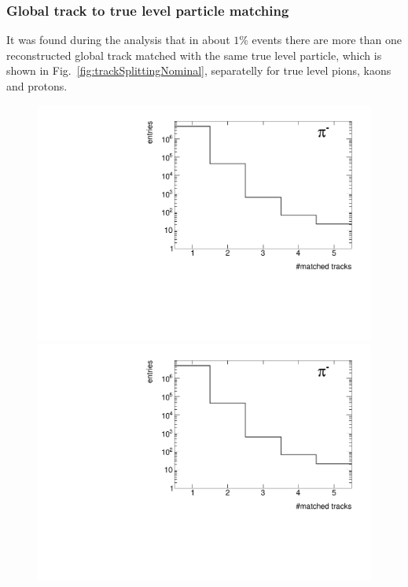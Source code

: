 \subsubsection{Global track to true level particle matching}
It was found during the analysis that in about $1\%$ events there are more than one reconstructed global track matched with the same true level particle, which is shown in Fig.~\ref{fig:trackSplittingNominal}, separatelly for true level pions, kaons and protons.
\begin{figure}[ht]
	\centering
	\parbox{0.329\textwidth}{
		\centering
		\includegraphics[width=\linewidth,page=1]{graphics/eff/trackSplitting_CD.pdf}\\
		\includegraphics[width=\linewidth,page=4]{graphics/eff/trackSplitting_CD.pdf}\\
}
\end{figure}
